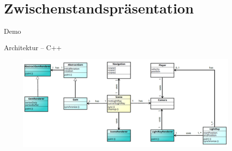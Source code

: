 

\subtitle{Game Programming}



\slidetitle
\section*{Zwischenstandspräsentation}

\begin{frame}{Demo}
	\centering
\end{frame}


\begin{frame}{Architektur -- C++}
	\begin{figure}
		\centering
		\includegraphics[width=\textwidth, height=\textheight, keepaspectratio]{images/klassendiagramm}
	\end{figure}
\end{frame}


